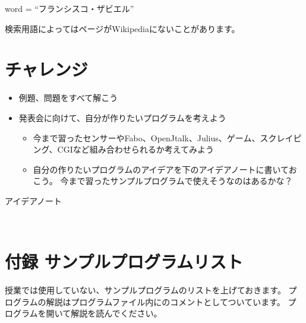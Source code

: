 \documentclass[a4paper,12pt,dvipdfmx]{jarticle}
\begin{document}
word = “フランシスコ・ザビエル”

検索用語によってはページがWikipediaにないことがあります。


\bigskip

\clearpage\section{チャレンジ}
\begin{itemize}
\item 例題、問題をすべて解こう
\item
発表会に向けて、自分が作りたいプログラムを考えよう

\begin{itemize}
\item
今まで習ったセンサーやFabo、OpenJtalk、Julius、ゲーム、スクレイピング、CGIなど組み合わせられるか考えてみよう
\item
自分の作りたいプログラムのアイデアを下のアイデアノートに書いておこう。
		今まで習ったサンプルプログラムで使えそうなのはあるかな？
\end{itemize}
\end{itemize}
アイデアノート

\begin{center}
\tablefirsthead{}
\tablehead{}
\tabletail{}
\tablelasttail{}
\begin{boxedminipage}{16.806cm}
	　　　　　　　　　　　　　　　　　　　　　　　　　
	\vspace{15cm}
\end{boxedminipage}
\end{center}

\bigskip

\clearpage\section{付録
サンプルプログラムリスト}
授業では使用していない、サンプルプログラムのリストを上げておきます。
プログラムの解説はプログラムファイル内にのコメントとしてついています。
プログラムを開いて解説を読んでください。
\end{document}
